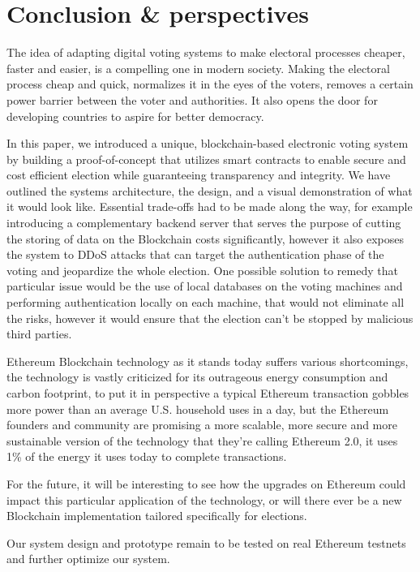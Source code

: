 \chapter{Conclusion \& perspectives}

The idea of adapting digital voting systems to make electoral processes cheaper, faster and easier, is a compelling one in modern society. Making the electoral process cheap and quick, normalizes it in the eyes of the voters, removes a certain power barrier between the voter and authorities. It also opens the door for developing countries to aspire for better democracy.

In this paper, we introduced a unique, blockchain-based electronic voting system by building a proof-of-concept that utilizes smart contracts to enable secure and cost efficient election while guaranteeing transparency and integrity. We have outlined the systems architecture, the design, and a visual demonstration of what it would look like. Essential trade-offs had to be made along the way, for example introducing a complementary backend server that serves the purpose of cutting the storing of data on the Blockchain costs significantly, however it also exposes the system to DDoS attacks that can target the authentication phase of the voting and jeopardize the whole election. One possible solution to remedy that particular issue would be the use of local databases on the voting machines and performing authentication locally on each machine, that would not eliminate all the risks, however it would ensure that the election can't be stopped by malicious third parties.

Ethereum Blockchain technology as it stands today suffers various shortcomings, the technology is vastly criticized for its outrageous energy consumption and carbon footprint, to put it in perspective a typical Ethereum transaction gobbles more power than an average U.S. household uses in a day\cite{fairleyEthereumWillCut2019}, but the Ethereum founders and community are promising a more scalable, more secure and more sustainable version of the technology that they're calling Ethereum 2.0, it uses 1\% of the energy it uses today to complete transactions\cite{fairleyEthereumWillCut2019}.

For the future, it will be interesting to see how the upgrades on Ethereum could impact this particular application of the technology, or will there ever be a new Blockchain implementation tailored specifically for elections.

Our system design and prototype remain to be tested on real Ethereum \gls{testnets} and further optimize our system.